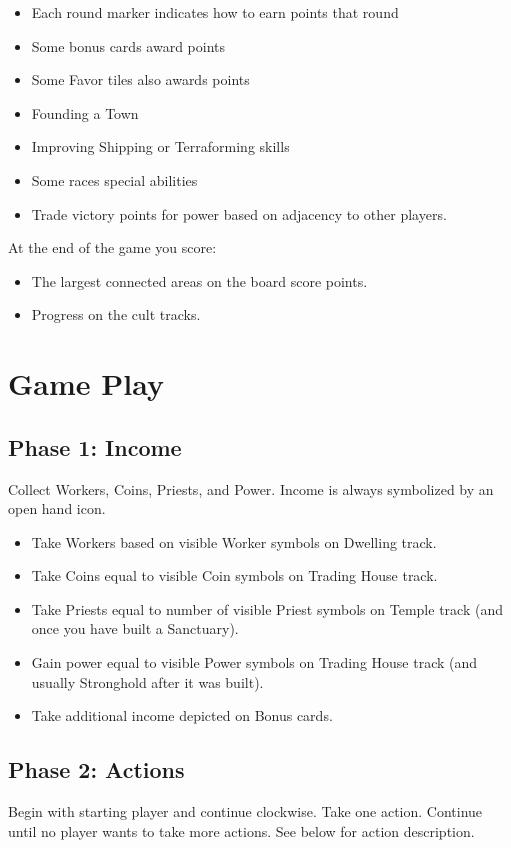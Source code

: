\documentclass[12pt]{article}
\newenvironment{itemizeCustom}
{\begin{itemize}
  \setlength{\itemsep}{1pt}
  \setlength{\parskip}{0pt}
  \setlength{\parsep}{0pt}}
{\end{itemize}}
\begin{document}
\begin{multicols*}{2}
\begin{itemizeCustom}
    \item Each round marker indicates how to earn points that round
    \item Some bonus cards award points
    \item Some Favor tiles also awards points
    \item Founding a Town
    \item Improving Shipping or Terraforming skills
    \item Some races special abilities
    \item Trade victory points for power based on adjacency to other players.
\end{itemizeCustom}

At the end of the game you score:
\begin{itemizeCustom}
    \item The largest connected areas on the board score points.
    \item Progress on the cult tracks.
\end{itemizeCustom}


\section*{Game Play}
\subsection*{Phase 1: Income}
Collect Workers, Coins, Priests, and Power. Income is always symbolized by an open hand icon. 
\begin{itemizeCustom}
    \item Take Workers based on visible Worker symbols on Dwelling track.
    \item Take Coins equal to visible Coin symbols on Trading House track.
    \item Take Priests equal to number of visible Priest symbols on Temple track (and once you have built a Sanctuary).
    \item Gain power equal to visible Power symbols on Trading House track (and usually Stronghold after it was built).
    \item Take additional income depicted on Bonus cards.
\end{itemizeCustom}

\subsection*{Phase 2: Actions}
Begin with starting player and continue clockwise. Take one action. Continue until no player wants to take more actions. See below for action description.


\end{multicols*}
\end{document}
